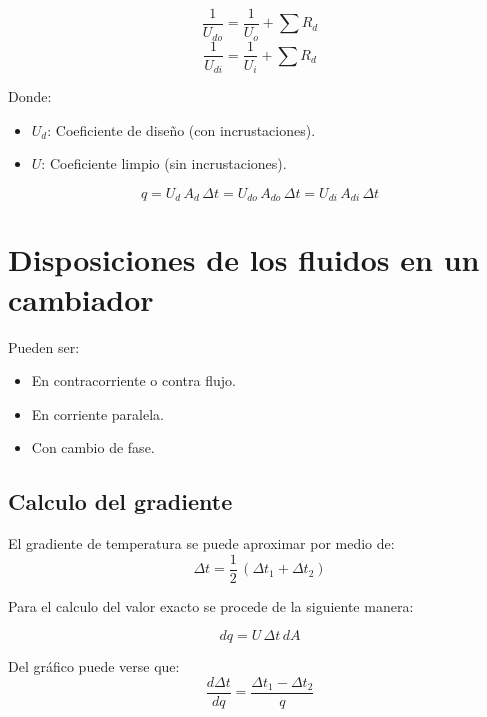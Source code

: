 \begin{equation}
    \frac{1}{U_{do}} = \frac{1}{U_o} + \sum R_d
\end{equation}
\begin{equation}
    \frac{1}{U_{di}} = \frac{1}{U_i} + \sum R_d
\end{equation}

Donde:
\begin{itemize}
    \item $U_d$: Coeficiente de diseño (con incrustaciones).
    \item $U$: Coeficiente limpio (sin incrustaciones).
\end{itemize}

\begin{equation}
    q = U_d\,A_d\,\Delta t = U_{do}\,A_{do}\,\Delta t = U_{di}\,A_{di}\,\Delta t
\end{equation}

\section{Disposiciones de los fluidos en un cambiador}
Pueden ser:

\begin{itemize}
    \item En contracorriente o contra flujo.
    \item En corriente paralela.
    \item Con cambio de fase.
\end{itemize}


\subsection{Calculo del gradiente}
El gradiente de temperatura se puede aproximar por medio de:
\begin{equation*}
    \Delta t = \frac{1}{2}\,(\Delta t_1 + \Delta t_2)
\end{equation*}

Para el calculo del valor exacto se procede de la siguiente manera:


\begin{equation*}
    dq = U\,\Delta t\,dA
\end{equation*}

Del gráfico puede verse que:
\begin{equation*}
    \frac{d\Delta t}{dq} = \frac{\Delta t_1 - \Delta t_2}{q}
\end{equation*}


